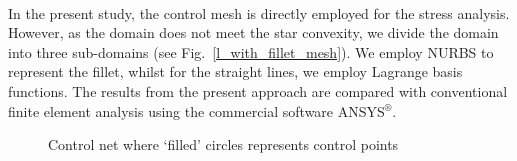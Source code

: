\paragraph{}
In the present study, the control mesh is directly employed for the stress analysis.
However, as the domain does not meet the star convexity, we divide the domain into three sub-domains 
    (see Fig.~\ref{l_with_fillet_mesh}).
We employ NURBS to represent the fillet, whilst for the straight lines, we employ Lagrange basis functions.
The results from the present approach are compared with conventional finite element analysis using the commercial
    software ANSYS$^\circledR$.
    \begin{figure}[h!]
        \centering
        \caption{Control net where `filled' circles represents control points}
        \label{fig:l_with_fillet_mesh}
    \end{figure}

